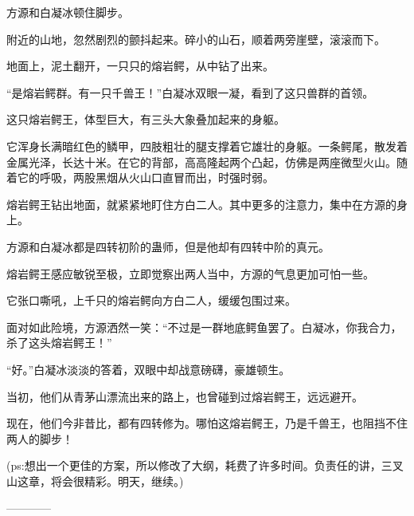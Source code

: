 \begin{this_body}
方源和白凝冰顿住脚步。

附近的山地，忽然剧烈的颤抖起来。碎小的山石，顺着两旁崖壁，滚滚而下。

地面上，泥土翻开，一只只的熔岩鳄，从中钻了出来。

“是熔岩鳄群。有一只千兽王！”白凝冰双眼一凝，看到了这只兽群的首领。

这只熔岩鳄王，体型巨大，有三头大象叠加起来的身躯。

它浑身长满暗红色的鳞甲，四肢粗壮的腿支撑着它雄壮的身躯。一条鳄尾，散发着金属光泽，长达十米。在它的背部，高高隆起两个凸起，仿佛是两座微型火山。随着它的呼吸，两股黑烟从火山口直冒而出，时强时弱。

熔岩鳄王钻出地面，就紧紧地盯住方白二人。其中更多的注意力，集中在方源的身上。

方源和白凝冰都是四转初阶的蛊师，但是他却有四转中阶的真元。

熔岩鳄王感应敏锐至极，立即觉察出两人当中，方源的气息更加可怕一些。

它张口嘶吼，上千只的熔岩鳄向方白二人，缓缓包围过来。

面对如此险境，方源洒然一笑：“不过是一群地底鳄鱼罢了。白凝冰，你我合力，杀了这头熔岩鳄王！”

“好。”白凝冰淡淡的答着，双眼中却战意磅礴，豪雄顿生。

当初，他们从青茅山漂流出来的路上，也曾碰到过熔岩鳄王，远远避开。

现在，他们今非昔比，都有四转修为。哪怕这熔岩鳄王，乃是千兽王，也阻挡不住两人的脚步！

(ps:想出一个更佳的方案，所以修改了大纲，耗费了许多时间。负责任的讲，三叉山这章，将会很精彩。明天，继续。)

------------

\end{this_body}

